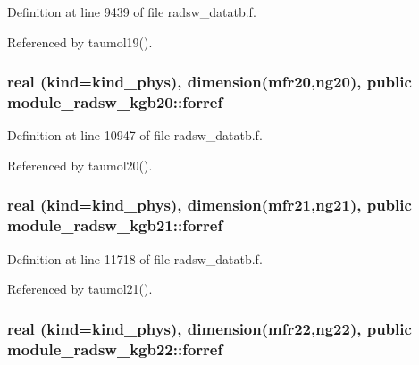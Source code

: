 Definition at line 9439 of file radsw\+\_\+datatb.\+f.



Referenced by taumol19().

\subsubsection[{\texorpdfstring{forref}{forref}}]{\setlength{\rightskip}{0pt plus 5cm}real (kind=kind\+\_\+phys), dimension(mfr20,ng20), public module\+\_\+radsw\+\_\+kgb20\+::forref}\hypertarget{group__module__radsw__main_ga3a660a7564064ca9997af9f95a5293b9}{}\label{group__module__radsw__main_ga3a660a7564064ca9997af9f95a5293b9}


Definition at line 10947 of file radsw\+\_\+datatb.\+f.



Referenced by taumol20().

\subsubsection[{\texorpdfstring{forref}{forref}}]{\setlength{\rightskip}{0pt plus 5cm}real (kind=kind\+\_\+phys), dimension(mfr21,ng21), public module\+\_\+radsw\+\_\+kgb21\+::forref}\hypertarget{group__module__radsw__main_gac93d473e0309275f03a89b161377a034}{}\label{group__module__radsw__main_gac93d473e0309275f03a89b161377a034}


Definition at line 11718 of file radsw\+\_\+datatb.\+f.



Referenced by taumol21().

\subsubsection[{\texorpdfstring{forref}{forref}}]{\setlength{\rightskip}{0pt plus 5cm}real (kind=kind\+\_\+phys), dimension(mfr22,ng22), public module\+\_\+radsw\+\_\+kgb22\+::forref}\hypertarget{group__module__radsw__main_ga509916fac772945555a1b3fd0d002c93}{}\label{group__module__radsw__main_ga509916fac772945555a1b3fd0d002c93}


